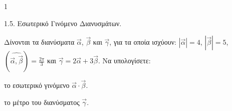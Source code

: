 \begin{ylh}{1}
    \item 1.5. Εσωτερικό Γινόμενο Διανυσμάτων.
\end{ylh}
Δίνονται τα διανύσματα $\vec{\alpha}$, $\vec{\beta}$ και $\vec{\gamma}$, για τα οποία ισχύουν: $|\vec{\alpha}|=4$, $|\vec{\beta}|=5$, $(\widehat{\vec{\alpha}, \vec{\beta}})=\frac{2\pi}{3}$ και $\vec{\gamma} = 2\vec{\alpha} + 3\vec{\beta}$. Να υπολογίσετε:
\begin{alist}
\item το εσωτερικό γινόμενο $\vec{\alpha} \cdot \vec{\beta}$. 
\item το μέτρο του διανύσματος $\vec{\gamma}$. 
\end{alist}